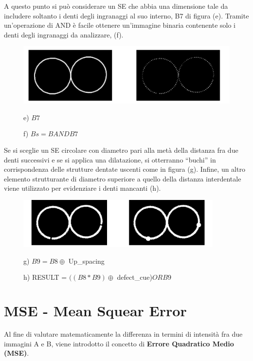 A questo punto si può considerare un SE che abbia una dimensione tale da includere soltanto i denti degli ingranaggi al suo interno,
B7 di figura (e). Tramite un'operazione di AND è facile ottenere un'immagine
binaria contenente solo i denti degli ingranaggi da analizzare, (f).

\begin{figure}[H]
    \centering
    \includegraphics[width=\linewidth, keepaspectratio]{capitoli/immagini/imgs/orologi4.png}
    \caption*{e) $B7$}
    \caption*{f) $Bs = B AND B7$}
\end{figure}

Se si sceglie un SE circolare con diametro pari alla metà della distanza fra due denti successivi e se si applica una dilatazione, si
otterranno “buchi” in corrispondenza delle strutture dentate uscenti come in figura (g). Infine, un altro elemento strutturante di diametro superiore a
quello della distanza interdentale viene utilizzato per evidenziare i denti mancanti (h).

\begin{figure}[H]
    \centering
    \includegraphics[width=\linewidth, keepaspectratio]{capitoli/immagini/imgs/orologi5.png}
    \caption*{g) $B9=B8 \oplus$ Up\_spacing}
    \caption*{h) RESULT = $((B8 * B9) \oplus$ defect\_cue)$OR B9$ }
\end{figure}

\section{MSE - Mean Squear Error}

Al fine di valutare matematicamente la differenza in termini di intensità fra due immagini A e B, viene introdotto il concetto di
\textbf{Errore Quadratico Medio (MSE)}.

